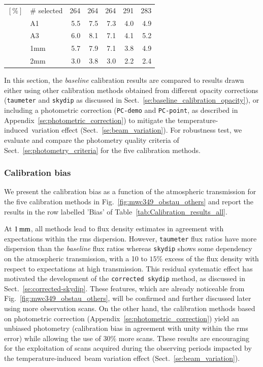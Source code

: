 \documentclass[traditionalabstract]{aa}
\newcommand{\afternoon}{temperature-induced}
\begin{document}
\begin{table}[!htbp]
\begin{center}
\begin{tabular}{clrrrrr}
  $[\%]$ &  $\#$ selected &   264    &    264   &    264    &    291    &  283 \\
       &  A1            &   5.5    &    7.5   &    7.3    &    4.0    &  4.9 \\
       &  A3            &   6.0    &    8.1   &    7.1    &    4.1    &  5.2 \\
       &  1mm           &   5.7    &    7.9   &    7.1    &    3.8    &  4.9 \\
       &  2mm           &   3.0    &    3.8   &    3.0    &    2.2    &  2.4 \\
\hline
\end{tabular}
\end{center}
\end{table}

In this section, the \emph{baseline} calibration results are compared to
results drawn either using other calibration methods obtained from different
opacity corrections ({\tt taumeter} and {\tt skydip} as
discussed in Sect.~\ref{se:baseline_calibration_opacity}), or
including a photometric correction ({\tt PC-demo} and {\tt PC-point},
as described in Appendix~\ref{se:photometric_correction}) to mitigate
the \afternoon\ variation effect (Sect.~\ref{se:beam_variation}).
For robustness test, we evaluate and compare the photometry quality criteria of
Sect.~\ref{se:photometry_criteria} for the five calibration methods.


\subsubsection{Calibration bias}
\label{se:calibration_bias_all}

We present the calibration bias as a function of the atmospheric
transmission for the five calibration methods in
Fig.~\ref{fig:mwc349_obstau_others} and report the results in the row
labelled 'Bias' of Table~\ref{tab:Calibration_results_all}.

At $1\,\rm{mm}$, all methods lead to flux density estimates in
agreement with expectations within the rms dispersion. However,
{\tt taumeter} flux ratios have more dispersion than
the \emph{baseline} flux ratios whereas {\tt skydip} shows some
dependency on the atmospheric
transmission, with a 10 to $15\%$ excess of the flux density with
respect to expectations at high transmission. This residual
systematic effect has motivated the development of the {\tt corrected
  skydip} method, as discussed in
Sect.~\ref{se:corrected-skydip}. These features, which are
already noticeable from Fig.~\ref{fig:mwc349_obstau_others}, will be
confirmed and further discussed later using more observation scans. On
the other hand, the calibration methods based on photometric
correction (Appendix~\ref{se:photometric_correction}) yield an
unbiased photometry (calibration bias in agreement with unity
within the rms error) while allowing the use of $30\%$ more
scans. These results are encouraging for the exploitation of scans
acquired during the observing periods
impacted by the \afternoon\ beam variation effect
(Sect.~\ref{se:beam_variation}).
\end{document}
